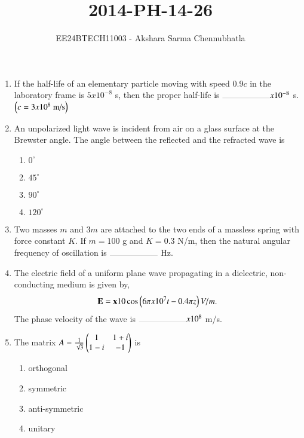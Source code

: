\documentclass[journal,12pt,onecolumn]{IEEEtran}
\theoremstyle{remark}
\begin{document}

\title{2014-PH-14-26}
\author{EE24BTECH11003 - Akshara Sarma Chennubhatla}
\maketitle
\begin{enumerate}

\item If the half-life of an elementary particle moving with speed $0.9c$ in the laboratory frame is $5 x 10^{-8}$ s, then the proper half-life is $\rule{2cm}{0.1pt} x 10^{-8}$ s. $\left(c=3 x 10^8 \text{ m/s}\right)$
\hfill{}

\item An unpolarized light wave is incident from air on a glass surface at the Brewster angle. The angle between the reflected and the refracted wave is
\hfill{}
\begin{enumerate}
\item $0^{\circ}$
\item $45^{\circ}$
\item $90^{\circ}$
\item $120^{\circ}$
\end{enumerate}

\item Two masses $m$ and $3m$ are attached to the two ends of a massless spring with force constant $K$. If $m=100$ g and $K=0.3$ N/m, then the natural angular frequency of oscillation is $\rule{2cm}{0.1pt}$ Hz.
\hfill{}

\item The electric field of a uniform plane wave propagating in a dielectric, non-conducting medium is given by,
\begin{align*}
\mathbf{E} = \mathbf{x}10\cos\left(6\pi x 10^7t - 0.4\pi z\right)V/m. 
\end{align*}
The phase velocity of the wave is $\rule{2cm}{0.1pt} x 10^8$ m/s.
\hfill{}

\item The matrix $A = \frac{1}{\sqrt{3}}\begin{pmatrix}1 & 1+i\\1-i & -1\end{pmatrix}$ is
\hfill{}
\begin{enumerate}
\item orthogonal
\item symmetric
\item anti-symmetric
\item unitary
\end{enumerate}


\end{enumerate}
\end{document}
